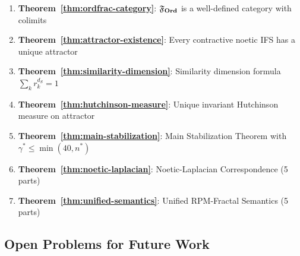 \begin{enumerate}
  \item \textbf{Theorem~\ref{thm:ordfrac-category}}: $\mathfrak{F}_{\mathbf{Ord}}$ is a well-defined category with colimits

  \item \textbf{Theorem~\ref{thm:attractor-existence}}: Every contractive noetic IFS has a unique attractor

  \item \textbf{Theorem~\ref{thm:similarity-dimension}}: Similarity dimension formula $\sum_k r_k^{d_S} = 1$

  \item \textbf{Theorem~\ref{thm:hutchinson-measure}}: Unique invariant Hutchinson measure on attractor

  \item \textbf{Theorem~\ref{thm:main-stabilization}}: Main Stabilization Theorem with $\gamma^* \leq \min(40, n^*)$

  \item \textbf{Theorem~\ref{thm:noetic-laplacian}}: Noetic-Laplacian Correspondence (5 parts)

  \item \textbf{Theorem~\ref{thm:unified-semantics}}: Unified RPM-Fractal Semantics (5 parts)
\end{enumerate}

\subsection{Open Problems for Future Work}

